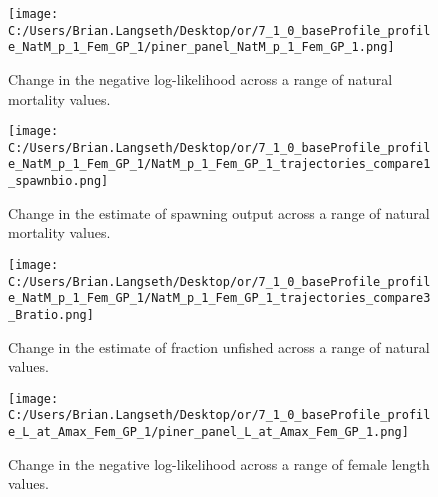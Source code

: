 \documentclass[11pt,
  english,
  a4paper,
]{article}
\begin{document}
\tagmcend\tagstructend


\begin{figure}
\centering
\texttt{[image: C:/Users/Brian.Langseth/Desktop/or/7\_1\_0\_baseProfile\_profile\_NatM\_p\_1\_Fem\_GP\_1/piner\_panel\_NatM\_p\_1\_Fem\_GP\_1.png]}
\caption{Change in the negative log-likelihood across a range of natural mortality values.\label{fig:m-profile}}
\end{figure}

\tagmcend\tagstructend


\begin{figure}
\centering
\texttt{[image: C:/Users/Brian.Langseth/Desktop/or/7\_1\_0\_baseProfile\_profile\_NatM\_p\_1\_Fem\_GP\_1/NatM\_p\_1\_Fem\_GP\_1\_trajectories\_compare1\_spawnbio.png]}
\caption{Change in the estimate of spawning output across a range of natural mortality values.\label{fig:m-ssb}}
\end{figure}

\tagmcend\tagstructend


\begin{figure}
\centering
\texttt{[image: C:/Users/Brian.Langseth/Desktop/or/7\_1\_0\_baseProfile\_profile\_NatM\_p\_1\_Fem\_GP\_1/NatM\_p\_1\_Fem\_GP\_1\_trajectories\_compare3\_Bratio.png]}
\caption{Change in the estimate of fraction unfished across a range of natural values.\label{fig:m-depl}}
\end{figure}

\tagmcend\tagstructend


\begin{figure}
\centering
\texttt{[image: C:/Users/Brian.Langseth/Desktop/or/7\_1\_0\_baseProfile\_profile\_L\_at\_Amax\_Fem\_GP\_1/piner\_panel\_L\_at\_Amax\_Fem\_GP\_1.png]}
\caption{Change in the negative log-likelihood across a range of female length values.\label{fig:linf-profile}}
\end{figure}
\end{document}
